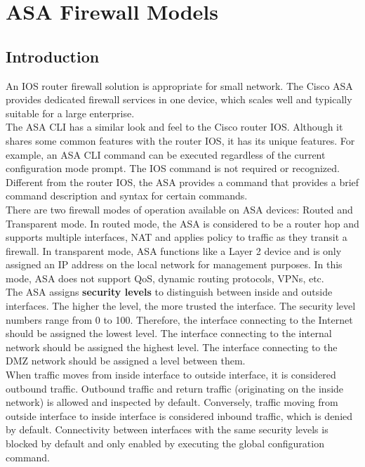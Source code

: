 \chapter{ASA Firewall Models}

\section{Introduction}

An IOS router firewall solution is appropriate for small network. The Cisco ASA provides dedicated firewall services in one device, which scales well and typically suitable for a large enterprise.\\

The ASA CLI has a similar look and feel to the Cisco router IOS. Although it shares some common features with the router IOS, it has its unique features. For example, an ASA CLI command can be executed regardless of the current configuration mode prompt. The IOS  command is not required or recognized. Different from the router IOS, the ASA provides a  command that provides a brief command description and syntax for certain commands.\\

There are two firewall modes of operation available on ASA devices: Routed and Transparent mode. In routed mode, the ASA is considered to be a router hop and supports multiple interfaces, NAT and applies policy to traffic as they transit a firewall. In transparent mode, ASA functions like a Layer 2 device and is only assigned an IP address on the local network for management purposes. In this mode, ASA does not support QoS, dynamic routing protocols, VPNs, etc.\\

The ASA assigns \textbf{security levels} to distinguish between inside and outside interfaces. The higher the level, the more trusted the interface. The security level numbers range from 0 to 100. Therefore, the interface connecting to the Internet should be assigned the lowest level. The interface connecting to the internal network should be assigned the highest level. The interface connecting to the DMZ network should be assigned a level between them.\\

When traffic moves from inside interface to outside interface, it is considered outbound traffic. Outbound traffic and return traffic (originating on the inside network) is allowed and inspected by default. Conversely, traffic moving from outside interface to inside interface is considered inbound traffic, which is denied by default. Connectivity between interfaces with the same security levels is blocked by default and only enabled by executing the  global configuration command.\\

